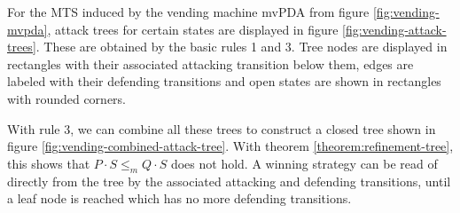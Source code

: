 \begin{example}
  For the MTS induced by the vending machine mvPDA from figure \ref{fig:vending-mvpda},
  attack trees for certain states are displayed in figure \ref{fig:vending-attack-trees}.
  These are obtained by the basic rules 1 and 3.
  Tree nodes are displayed in rectangles with their associated attacking transition
  below them, edges are labeled with their defending transitions and
  open states are shown in rectangles with rounded corners.

  With rule 3, we can combine all these trees to construct 
  a closed tree shown in figure
  \ref{fig:vending-combined-attack-tree}.
  With theorem \ref{theorem:refinement-tree}, this shows that
  $P⋅S ≤_m Q⋅S$ does not hold. A winning strategy 
  can be read of directly from the tree by the associated
  attacking and defending transitions, until a leaf node
  is reached which has no more defending transitions.
\end{example}

